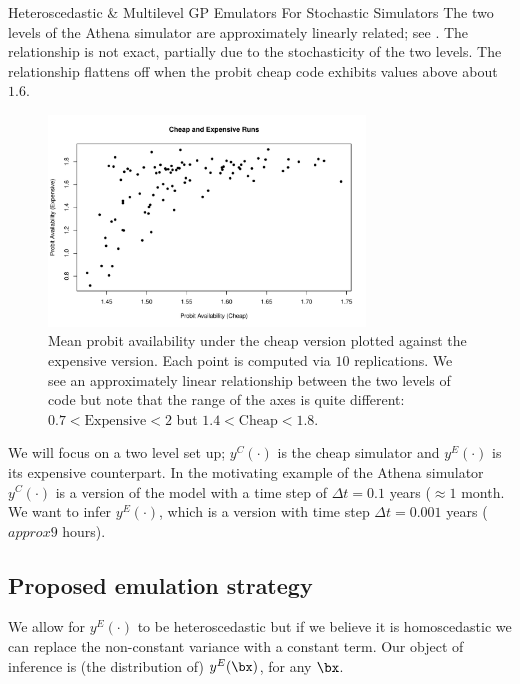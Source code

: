 \begin{chapter}{Heteroscedastic \& Multilevel GP Emulators For Stochastic Simulators\label{Ch:Hetsml}}
 The two levels of the Athena simulator are approximately linearly related; see . The relationship is not exact, partially due to the stochasticity of the two levels. The relationship flattens off when the probit cheap code exhibits values above about $1.6$.
\begin{figure}[ht]
  \centering
  \includegraphics[width=0.75\textwidth]{sml-het-fig2/cheapVexp.pdf}
\caption{Mean probit availability under the cheap version plotted against the expensive version. Each point is computed via $10$ replications. We see an approximately linear relationship between the two levels of code but note that the range of the axes is quite different: $0.7<\text{Expensive}<2$ but $1.4<\text{Cheap}<1.8$. }
  \label{Fig:cheapandexp}
\end{figure}
We will focus on a two level set up;  $y^C(\cdot)$ is the cheap simulator and $y^E(\cdot)$ is its expensive counterpart. In the motivating example of the Athena simulator $y^C(\cdot)$ is a version of the model with a time step of $\Delta t = 0.1$ years ($\approx 1$ month. We want to infer $y^E (\cdot)$, which is a version with time step $\Delta t = 0.001$ years ($approx 9$ hours).
\subsection{Proposed emulation strategy}
We allow for $y^E(\cdot)$ to be heteroscedastic but if we believe it is homoscedastic we can replace the non-constant variance with a constant term. Our object of inference is (the distribution of) $y^E(\bx)$, for any $\bx$.


\end{chapter}
